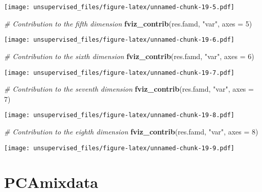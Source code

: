 \documentclass[
]{article}
\newenvironment{Shaded}{\begin{snugshade}}{\end{snugshade}}
\newcommand{\CommentTok}[1]{\textcolor[rgb]{0.56,0.35,0.01}{\textit{#1}}}
\newcommand{\DataTypeTok}[1]{\textcolor[rgb]{0.13,0.29,0.53}{#1}}
\newcommand{\DecValTok}[1]{\textcolor[rgb]{0.00,0.00,0.81}{#1}}
\newcommand{\KeywordTok}[1]{\textcolor[rgb]{0.13,0.29,0.53}{\textbf{#1}}}
\newcommand{\NormalTok}[1]{#1}
\newcommand{\StringTok}[1]{\textcolor[rgb]{0.31,0.60,0.02}{#1}}
\begin{document}
\texttt{[image: unsupervised\_files/figure-latex/unnamed-chunk-19-5.pdf]}

\begin{Shaded}
\begin{Highlighting}[]
\CommentTok{# Contribution to the fifth dimension}
\KeywordTok{fviz_contrib}\NormalTok{(res.famd, }\StringTok{"var"}\NormalTok{, }\DataTypeTok{axes =} \DecValTok{5}\NormalTok{)}
\end{Highlighting}
\end{Shaded}

\texttt{[image: unsupervised\_files/figure-latex/unnamed-chunk-19-6.pdf]}

\begin{Shaded}
\begin{Highlighting}[]
\CommentTok{# Contribution to the sixth dimension}
\KeywordTok{fviz_contrib}\NormalTok{(res.famd, }\StringTok{"var"}\NormalTok{, }\DataTypeTok{axes =} \DecValTok{6}\NormalTok{)}
\end{Highlighting}
\end{Shaded}

\texttt{[image: unsupervised\_files/figure-latex/unnamed-chunk-19-7.pdf]}

\begin{Shaded}
\begin{Highlighting}[]
\CommentTok{# Contribution to the seventh dimension}
\KeywordTok{fviz_contrib}\NormalTok{(res.famd, }\StringTok{"var"}\NormalTok{, }\DataTypeTok{axes =} \DecValTok{7}\NormalTok{)}
\end{Highlighting}
\end{Shaded}

\texttt{[image: unsupervised\_files/figure-latex/unnamed-chunk-19-8.pdf]}

\begin{Shaded}
\begin{Highlighting}[]
\CommentTok{# Contribution to the eighth dimension}
\KeywordTok{fviz_contrib}\NormalTok{(res.famd, }\StringTok{"var"}\NormalTok{, }\DataTypeTok{axes =} \DecValTok{8}\NormalTok{)}
\end{Highlighting}
\end{Shaded}

\texttt{[image: unsupervised\_files/figure-latex/unnamed-chunk-19-9.pdf]}

\hypertarget{pcamixdata}{%
\section{PCAmixdata}\label{pcamixdata}}
\end{document}
